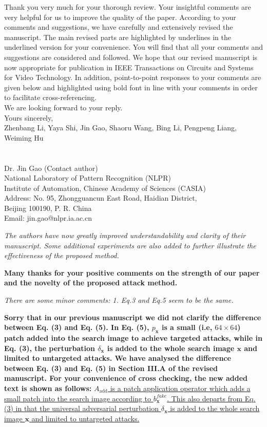 \documentclass[12pt]{article}
\begin{document}
Thank you very much for your thorough review. Your insightful comments are very helpful for us to improve the quality of the paper. According to your comments and suggestions, we have carefully and extensively revised the manuscript. The main revised parts are highlighted by underlines in the underlined version for your convenience. You will find that all your comments and suggestions are considered and followed. We hope that our revised manuscript is now appropriate for publication in IEEE Transactions on Circuits and Systems for Video Technology.
In addition, point-to-point responses to your comments are given below and highlighted using bold font in line with your comments in order to facilitate cross-referencing.\\[10pt]
\indent We are looking forward to your reply.\\[10pt]
\noindent Yours sincerely,\\
\noindent Zhenbang Li, Yaya Shi, Jin Gao, Shaoru Wang, Bing Li, Pengpeng Liang, Weiming Hu
\\
\\
\\
\noindent Dr. Jin Gao (Contact author)\\
\noindent National Laboratory of Pattern Recognition (NLPR)\\
\noindent Institute of Automation, Chinese Academy of Sciences (CASIA)\\
\noindent Address: No. 95, Zhongguancun East Road, Haidian District,\\
\noindent Beijing 100190, P. R. China\\
\noindent Email: jin.gao@nlpr.ia.ac.cn

\newpage
\textit{The authors have now greatly improved understandability and clarity of their manuscript. Some additional experiments are also added to further illustrate the effectiveness of the proposed method.}

\textbf{Many thanks for your positive comments on the strength of our paper and the novelty of the proposed attack method.}

\textit{There are some minor comments: 1. Eq.3 and Eq.5 seem to be the same.}

\textbf{Sorry that in our previous manuscript we did not clarify the difference between Eq. (3) and Eq. (5). In Eq. (5), $p_\textbf{x}$ is a small (i.e, $64\times64$) patch added into the search image to achieve targeted attacks, while in Eq. (3), the perturbation $\delta_\textbf{x}$ is added to the whole search image $\textbf{x}$ and limited to untargeted attacks. We have analysed the difference between Eq. (3) and Eq. (5) in Section III.A of the revised manuscript. For your convenience of cross checking, the new added text is shown as follows:} \uline{$A_{\text{add}}$ is a patch application operator which adds a small patch into the search image according to $b^{fake}_{\textbf{x}}$. This also departs from Eq. (3) in that the universal adversarial perturbation $\delta_\textbf{x}$ is added to the whole search image $\textbf{x}$ and limited to untargeted attacks.}
\end{document}
